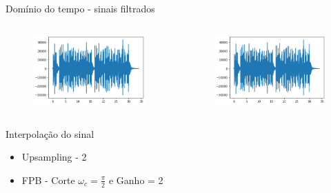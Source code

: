 \documentclass{beamer}
\begin{document}
\begin{frame}{Domínio do tempo - sinais filtrados}
    \begin{columns}
            \begin{figure}
                \centering
                \includegraphics[width = \columnwidth]{tempo_filtro1.png}
            \end{figure}
            
        \begin{figure}
            \centering
            \includegraphics[width = \columnwidth]{tempo_filtro2.png}
        \end{figure}
    \end{columns}
\end{frame}

\begin{frame}{Interpolação do sinal}
   \begin{itemize}
       \item Upsampling - 2
       \item FPB - Corte $\omega_c = \frac{\pi}{2}$ e Ganho = 2
   \end{itemize}
\end{frame}
\end{document}
